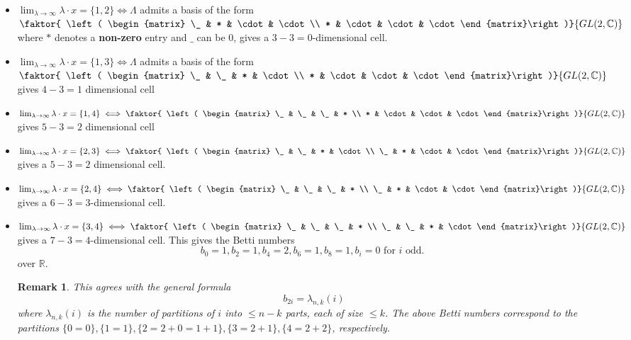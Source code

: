 \documentclass{amsart}
\newtheorem{remark}[theorem]{Remark}
\newcommand{\R}{\mathbb{R}}
\begin{document}
\begin{itemize}
    \item $\lim_{\lambda\rightarrow\infty} \lambda\cdot x = \{1,2\} \iff \Lambda$ admits a basis of the form $\faktor{ \left( \begin{matrix} \_ & * & \cdot & \cdot \\ * & \cdot & \cdot & \cdot \end{matrix}\right)}{GL(2,\C)}$ where $*$ denotes a \textbf{non-zero} entry and $\_$ can be $0$, gives a $3-3=0$-dimensional cell. 
    \item $\lim_{\lambda\rightarrow \infty} \lambda\cdot x = \{1,3\} \iff  \Lambda$ admits a basis of the form $\faktor{ \left( \begin{matrix} \_ & \_ & * & \cdot \\ * & \cdot & \cdot & \cdot \end{matrix}\right)}{GL(2,\C)}$ gives $4-3=1$ dimensional cell\\
    \item $\lim_{\lambda\rightarrow\infty} \lambda\cdot x = \{1,4\} \iff \faktor{ \left( \begin{matrix} \_ & \_ & \_ & * \\ * & \cdot & \cdot & \cdot \end{matrix}\right)}{GL(2,\C)}$ gives $5-3=2$ dimensional cell\\
    \item $\lim_{\lambda\rightarrow\infty}\lambda\cdot x  = 
    \{2,3\} \iff \faktor{ \left( \begin{matrix} \_ & \_ & * & \cdot \\ \_ & * & \cdot & \cdot \end{matrix}\right)}{GL(2,\C)}$ 
    gives a $5-3=2$ dimensional cell. \\
    \item $\lim_{\lambda\rightarrow\infty} \lambda\cdot x = \{2,4\} \iff \faktor{ \left( \begin{matrix} \_ & \_ & \_ & * \\ \_ & * & \cdot & \cdot \end{matrix}\right)}{GL(2,\C)}$ gives a $6-3=3$-dimensional cell. \\
    \item $\lim_{\lambda\rightarrow\infty} \lambda \cdot x = \{3,4\} \iff \faktor{ \left( \begin{matrix} \_ & \_ & \_ & * \\ \_ & \_ & * & \cdot \end{matrix}\right)}{GL(2,\C)}$ gives a $7-3=4$-dimensional cell. This gives the Betti numbers \[ b_0=1, b_2=1, b_4=2, b_6=1, b_8=1, b_i=0 \text{ for }i\text{ odd. }\] over $\R$. 

    \begin{remark} This agrees with the general formula \[ b_{2i} = \lambda_{n,k}(i) \] where $\lambda_{n,k}(i)$ is the number of partitions of $i$ into $\leq n-k$ parts, each of size $\leq k$. The above Betti numbers correspond to the partitions $\{0=0\}, \{1=1\}, \{2=2+0=1+1\}, \{3=2+1\}, \{4=2+2\}$, respectively. \end{remark}
\end{itemize}
\end{document}
